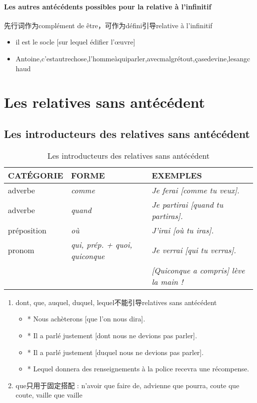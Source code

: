 \documentclass[UTF8]{report}
\begin{document}
\paragraph{Les autres antécédents possibles pour la relative à l’infinitif}
先行词作为complément de être，可作为défini引导relative à l’infinitif

\begin{itemize}
    \item il est le socle [sur lequel édifier l’œuvre]
    \item Antoine,c’estautrechose,l’hommeàquiparler,avecmalgrétout,çasedevine,lesangchaud
\end{itemize}

\section{Les relatives sans antécédent}

\subsection{Les introducteurs des relatives sans antécédent}

\begin{table}[H]
    \centering 
    \begin{tabular}{|l|l|l|}
    \hline
    \rowcolor{cyan!20}
    \textbf{CATÉGORIE} & \textbf{FORME} & \textbf{EXEMPLES} \\
    \hline
    adverbe & \textit{comme} & \textit{Je ferai [comme tu veux].} \\
    \hline
    adverbe & \textit{quand} & \textit{Je partirai [quand tu partiras].} \\
    \hline
    préposition & \textit{où} & \textit{J'irai [où tu iras].} \\
    \hline
    pronom & \textit{qui, prép. + quoi, quiconque} & \textit{Je verrai [qui tu verras].} \\
    & & \textit{[Quiconque a compris] lève la main !} \\
    \hline
    \end{tabular}
    \caption{Les introducteurs des relatives sans antécédent}
\end{table}

\begin{enumerate}
    \item dont, que, auquel, duquel, lequel不能引导relatives sans antécédent
    \begin{itemize}
        \item * Nous achèterons [que l’on nous dira].
        \item * Il a parlé justement [dont nous ne devions pas parler].
        \item * Il a parlé justement [duquel nous ne devions pas parler].
        \item * Lequel donnera des renseignements à la police recevra une récompense.
    \end{itemize}
    \item que只用于固定搭配 : n’avoir que faire de, advienne que pourra, coute que coute, vaille que vaille
\end{enumerate}
\end{document}
